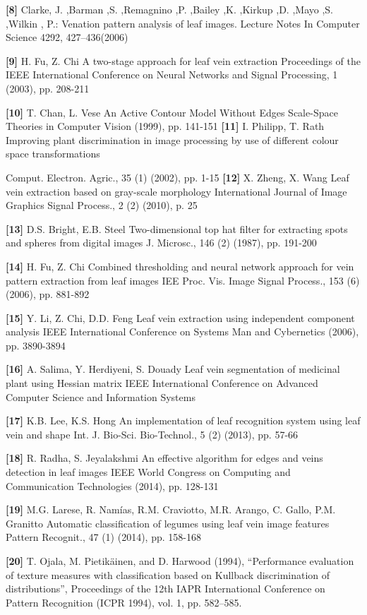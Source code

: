 \documentclass{report}
\begin{document}
{\begin{justify}
\textbf{[8]} Clarke, J. ,Barman ,S. ,Remagnino ,P. ,Bailey ,K. ,Kirkup ,D.
,Mayo ,S. ,Wilkin , P.: Venation pattern analysis of leaf images. Lecture Notes In Computer Science 4292, 427–436(2006)

\textbf{[9]} H. Fu, Z. Chi A two-stage approach for leaf vein extraction Proceedings of the IEEE International Conference on Neural Networks and Signal Processing, 1 (2003), pp. 208-211

\textbf{[10]} T. Chan, L. Vese An Active Contour Model Without Edges
Scale-Space Theories in Computer Vision (1999), pp. 141-151
\textbf{[11]} I. Philipp, T. Rath
Improving plant discrimination in image processing by use of different
colour space transformations

Comput. Electron. Agric., 35 (1) (2002), pp. 1-15
\textbf{[12]} X. Zheng, X. Wang
Leaf vein extraction based on gray-scale morphology International
Journal of Image
Graphics Signal Process., 2 (2) (2010), p. 25

\textbf{[13]} D.S. Bright, E.B. Steel
Two-dimensional top hat filter for extracting spots and spheres from
digital images
J. Microsc., 146 (2) (1987), pp. 191-200

\textbf{[14]} H. Fu, Z. Chi
Combined thresholding and neural network approach for vein pattern
extraction from leaf images
IEE Proc. Vis. Image Signal Process., 153 (6) (2006), pp. 881-892

\textbf{[15]} Y. Li, Z. Chi, D.D. Feng
Leaf vein extraction using independent component analysis
IEEE International Conference on Systems Man and Cybernetics
(2006), pp. 3890-3894

\textbf{[16]} A. Salima, Y. Herdiyeni, S. Douady Leaf vein segmentation of medicinal plant using Hessian matrix
IEEE International Conference on Advanced Computer Science and
Information Systems

\textbf{[17]} K.B. Lee, K.S. Hong
An implementation of leaf recognition system using leaf vein and shape
Int. J. Bio-Sci. Bio-Technol., 5 (2) (2013), pp. 57-66

\textbf{[18]} R. Radha, S. Jeyalakshmi
An effective algorithm for edges and veins detection in leaf images
IEEE World Congress on Computing and Communication Technologies
(2014), pp. 128-131

\textbf{[19]} M.G. Larese, R. Namías, R.M. Craviotto, M.R. Arango, C. Gallo,
P.M. Granitto
Automatic classification of legumes using leaf vein image features
Pattern Recognit., 47 (1) (2014), pp. 158-168

\textbf{[20]} T. Ojala, M. Pietikäinen, and D. Harwood (1994), “Performance evaluation of texture measures with classification based on Kullback discrimination of distributions”, Proceedings of the 12th IAPR International Conference on Pattern Recognition (ICPR 1994), vol. 1, pp. 582–585.
\end{justify}
}
\end{document}
